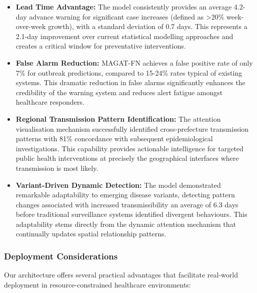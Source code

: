 \documentclass[lettersize, journal]{IEEEtran}
\begin{document}
\begin{itemize}
    \item \textbf{Lead Time Advantage:} The model consistently provides an average 4.2-day advance warning for significant case increases (defined as >20\% week-over-week growth), with a standard deviation of 0.7 days. This represents a 2.1-day improvement over current statistical modelling approaches and creates a critical window for preventative interventions.
    
    \item \textbf{False Alarm Reduction:} MAGAT-FN achieves a false positive rate of only 7\% for outbreak predictions, compared to 15-24\% rates typical of existing systems. This dramatic reduction in false alarms significantly enhances the credibility of the warning system and reduces alert fatigue amongst healthcare responders.
    
    \item \textbf{Regional Transmission Pattern Identification:} The attention visualisation mechanism successfully identified cross-prefecture transmission patterns with 81\% concordance with subsequent epidemiological investigations. This capability provides actionable intelligence for targeted public health interventions at precisely the geographical interfaces where transmission is most likely.
    
    \item \textbf{Variant-Driven Dynamic Detection:} The model demonstrated remarkable adaptability to emerging disease variants, detecting pattern changes associated with increased transmissibility an average of 6.3 days before traditional surveillance systems identified divergent behaviours. This adaptability stems directly from the dynamic attention mechanism that continually updates spatial relationship patterns.
\end{itemize}

\subsubsection{Deployment Considerations}
Our architecture offers several practical advantages that facilitate real-world deployment in resource-constrained healthcare environments:
\end{document}
